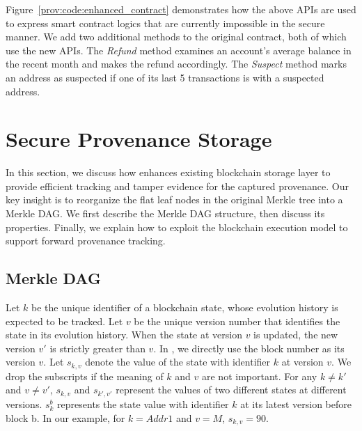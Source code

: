 Figure~\ref{prov:code:enhanced_contract} demonstrates how the above APIs are used to express smart contract logics
that are currently impossible in the secure manner.
We add two additional methods to the original contract, both of which use the new
APIs. The \textit{Refund} method examines an account's average balance in the recent month and makes the
refund accordingly. The \textit{Suspect} method marks an address as suspected if one of its last 5
transactions is with a suspected address. 



\section{Secure Provenance Storage} 
\label{prov:sec:storage}
In this section, we discuss how {\fs} enhances existing blockchain storage layer to provide efficient
tracking and tamper evidence for the captured provenance. Our key insight is to reorganize the flat leaf
nodes in the original Merkle tree into a Merkle DAG. We first describe the Merkle DAG structure, then discuss
its properties. Finally, we explain how to exploit the blockchain execution model to support forward
provenance tracking. 

\subsection{Merkle DAG}

Let $k$ be the unique identifier of a blockchain state, whose evolution history is expected to be tracked. 
Let $v$ be the unique version number that identifies the state in its evolution history. 
When the state at version $v$ is updated, the new version $v'$ is strictly greater than $v$. 
In {\fs}, we directly use the block number as its version $v$. 
Let $s_{k,v}$ denote the value of the state with identifier
$k$ at version $v$. We drop the subscripts if the meaning of $k$ and $v$ are not important. For any $k \neq
k'$ and $v \neq v'$, $s_{k,v}$ and $s_{k',v'}$ represent the values of two different states at different versions.  
$s^b_k$ represents the state value with identifier $k$ at its latest version before block b. 
In our example, for $k=Addr1$ and $v=M$, $s_{k,v}=90$.

